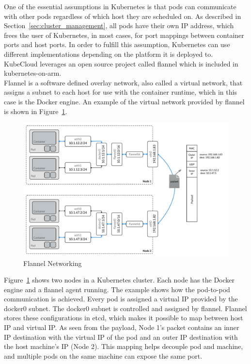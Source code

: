 \noindent One of the essential assumptions in Kubernetes is that pods can communicate with other pods regardless of which host they are scheduled on. As described in Section~\ref{sec:cluster_management}, all pods have their own IP address, which frees the user of Kubernetes, in most cases, for port mappings between container ports and host ports. In order to fulfill this assumption, Kubernetes can use different implementations depending on the platform it is deployed to. KubeCloud leverages an open source project called flannel which is included in kubernetes-on-arm. \\

\noindent
Flannel is a software defined overlay network, also called a virtual network, that assigns a subnet to each host for use with the container runtime, which in this case is the Docker engine. An example of the virtual network provided by flannel is shown in Figure~\ref{fig:flannel}.

\begin{figure}[H]
    \centering
    \includegraphics[width=\textwidth]{figures/kubernetes/flannel_networking}
    \caption{Flannel Networking}
    \label{fig:flannel}
\end{figure}

\noindent Figure~\ref{fig:flannel} shows two nodes in a Kubernetes cluster. Each node has the Docker engine and a flannel agent running. The example shows how the pod-to-pod communication is achieved. Every pod is assigned a virtual IP provided by the docker0 subnet. The docker0 subnet is controlled and assigned by flannel. Flannel stores these configurations in etcd, which makes it possible to map between host IP and virtual IP. As seen from the payload, Node 1's packet contains an inner IP destination with the virtual IP of the pod and an outer IP destination with the host machine's IP (Node 2). This mapping helps decouple pod and machine, and multiple pods on the same machine can expose the same port.